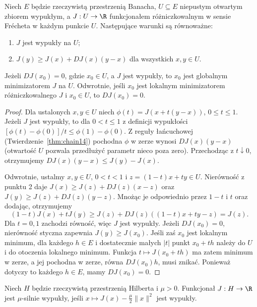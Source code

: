 \begin{twierdzenie}
\label{thm:convex-derivative16}
Niech $E$ będzie rzeczywistą przestrzenią Banacha,
$U\subseteq E$ niepustym otwartym zbiorem wypukłym, a
$J:U\to\R$ funkcjonałem różniczkowalnym w sensie
Frécheta w każdym punkcie $U$.
Następujące warunki są równoważne:
\begin{enumerate}
\item $J$ jest wypukły na $U$;
\item $J(y)\ge J(x)+DJ(x)(y-x)$ dla wszystkich $x,y\in U$.
\end{enumerate}
Jeżeli $DJ(x_0)=0$, gdzie $x_0\in U$, a $J$ jest wypukły,
to $x_0$ jest globalnym minimizatorem $J$ na $U$.
Odwrotnie, jeśli $x_0$ jest lokalnym minimizatorem
różniczkowalnego $J$ i $x_0\in U$, to $DJ(x_0)=0$.
\end{twierdzenie}
\begin{proof}
Dla ustalonych $x,y\in U$ niech
$\phi(t)=J(x+t(y-x))$, $0\le t\le1$.
Jeżeli $J$ jest wypukły, to dla $0<t\le1$
z definicji wypukłości
$[\phi(t)-\phi(0)]/t\le\phi(1)-\phi(0)$.
Z reguły łańcuchowej (Twierdzenie~\ref{thm:chain14})
pochodna $\phi$ w zerze wynosi $DJ(x)(y-x)$
(otwartość $U$ pozwala przedłużyć parametr nieco poza zero).
Przechodząc z $t\downarrow0$, otrzymujemy
$DJ(x)(y-x)\le J(y)-J(x)$.

Odwrotnie, ustalmy $x,y\in U$, $0<t<1$ i
$z=(1-t)x+ty\in U$.
Nierówność z punktu 2 daje
$J(x)\ge J(z)+DJ(z)(x-z)$ oraz
$J(y)\ge J(z)+DJ(z)(y-z)$.
Mnożąc je odpowiednio przez $1-t$ i $t$ oraz dodając,
otrzymujemy
\[
 (1-t)J(x)+tJ(y)\ge J(z)+DJ(z)((1-t)x+ty-z)=J(z).
\]
Dla $t=0,1$ zachodzi równość, więc $J$ jest wypukły.
Jeżeli $DJ(x_0)=0$, nierówność styczna zapewnia
$J(y)\ge J(x_0)$. Jeśli zaś $x_0$ jest lokalnym minimum,
dla każdego $h\in E$ i dostatecznie małych $|t|$
punkt $x_0+th$ należy do $U$ i do otoczenia lokalnego
minimum. Funkcja $t\mapsto J(x_0+th)$ ma zatem
minimum w zerze, a jej pochodna w zerze, równa
$DJ(x_0)h$, musi znikać. Ponieważ dotyczy to
każdego $h\in E$, mamy $DJ(x_0)=0$.
\end{proof}

\begin{definicja}
\label{def:strong-convex16}
Niech $H$ będzie rzeczywistą przestrzenią Hilberta
i $\mu>0$. Funkcjonał $J:H\to\R$ jest
$\mu$-silnie wypukły, jeśli $x\mapsto J(x)-\frac\mu2\|x\|^2$
jest wypukły.
\end{definicja}

